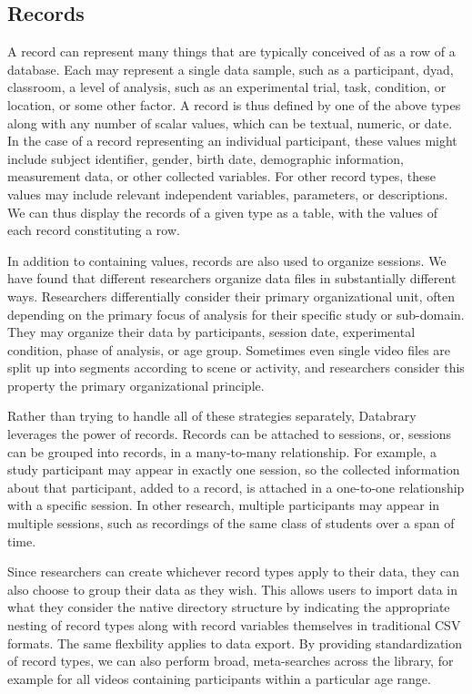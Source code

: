 \documentclass{sig-alternate}
\begin{document}
\subsection{Records}
A record can represent many things that are typically conceived of as a row of a database.
Each may represent a single data sample, such as a participant, dyad, classroom, a level of analysis, such as an experimental trial, task, condition, or location, or some other factor. 
A record is thus defined by one of the above types along with any number of scalar values, which can be textual, numeric, or date.
In the case of a record representing an individual participant, these values might include subject identifier, gender, birth date, demographic information, measurement data, or other collected variables.
For other record types, these values may include relevant independent variables, parameters, or descriptions. 
We can thus display the records of a given type as a table, with the values of each record constituting a row.

In addition to containing values, records are also used to organize sessions.
We have found that different researchers organize data files in substantially different ways.
Researchers differentially consider their primary organizational unit, often depending on the primary focus of analysis for their specific study or sub-domain.
They may organize their data by participants, session date, experimental condition, phase of analysis, or age group.
Sometimes even single video files are split up into segments according to scene or activity, and researchers consider this property the primary organizational principle.

Rather than trying to handle all of these strategies separately, Databrary leverages the power of records.
Records can be attached to sessions, or, sessions can be grouped into records, in a many-to-many relationship.
For example, a study participant may appear in exactly one session, so the collected information about that participant, added to a record, is attached in a one-to-one relationship with a specific session.
In other research, multiple participants may appear in multiple sessions, such as recordings of the same class of students over a span of time.

Since researchers can create whichever record types apply to their data, they can also choose to group their data as they wish.
This allows users to import data in what they consider the native directory structure by indicating the appropriate nesting of record types along with record variables themselves in traditional CSV formats.
The same flexbility applies to data export.
By providing standardization of record types, we can also perform broad, meta-searches across the library, for example for all videos containing participants within a particular age range.
\end{document}
